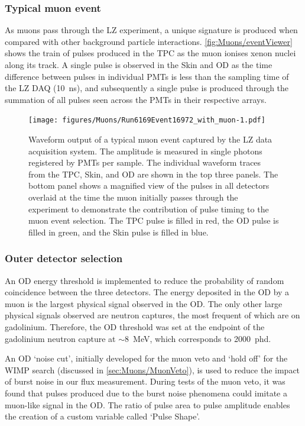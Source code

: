 \subsubsection{Typical muon event}
As muons pass through the LZ experiment, a unique signature is produced when compared with other background particle interactions. \autoref{fig:Muons/eventViewer} shows the train of pulses produced in the TPC as the muon ionises xenon nuclei along its track. A single pulse is observed in the Skin and OD as the time difference between pulses in individual PMTs is less than the sampling time of the LZ DAQ (10~ns), and subsequently a single pulse is produced through the summation of all pulses seen across the PMTs in their respective arrays.
\begin{figure}[h!]
    \centering \texttt{[image: figures/Muons/Run6169Event16972\_with\_muon-1.pdf]}
    \caption[Waveform output of a typical muon event captured by the LZ data acquisition system.]{Waveform output of a typical muon event captured by the LZ data acquisition system. The amplitude is measured in single photons registered by PMTs per sample. The individual waveform traces from the TPC, Skin, and OD are shown in the top three panels. The bottom panel shows a magnified view of the pulses in all detectors overlaid at the time the muon initially passes through the experiment to demonstrate the contribution of pulse timing to the muon event selection. The TPC pulse is filled in red, the OD pulse is filled in green, and the Skin pulse is filled in blue.}
    \label{fig:Muons/eventViewer}
\end{figure}

\subsubsection{Outer detector selection}\label{sec:Muons/MuonFluxODSelection}
An OD energy threshold is implemented to reduce the probability of random coincidence between the three detectors. The energy deposited in the OD by a muon is the largest physical signal observed in the OD. The only other large physical signals observed are neutron captures, the most frequent of which are on gadolinium. Therefore, the OD threshold was set at the endpoint of the gadolinium neutron capture at $\sim$8~MeV, which corresponds to 2000~phd.

An OD `noise cut', initially developed for the muon veto and `hold off' for the WIMP search (discussed in \autoref{sec:Muons/MuonVeto}), is used to reduce the impact of burst noise in our flux measurement. During tests of the muon veto, it was found that pulses produced due to the burst noise phenomena could imitate a muon-like signal in the OD. The ratio of pulse area to pulse amplitude enables the creation of a custom variable called `Pulse Shape'.

